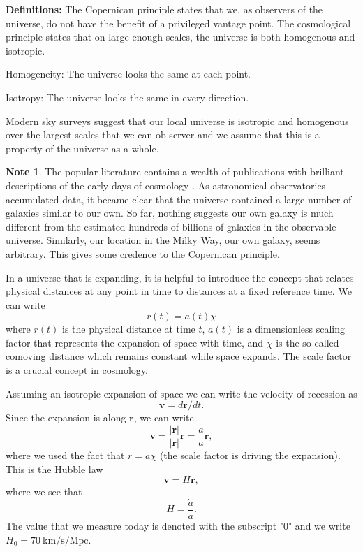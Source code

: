 \documentclass[a4paper,12pt]{article}
\theoremstyle{remark}
\newcommand{\mrm}[1]{\mathrm{#1}}
\renewcommand{\=}[1]{\stackrel{#1}{=}} %
\theoremstyle{plain}
\theoremstyle{definition}
\newtheorem*{definitionT}{Note}%
\newenvironment{note}{
\begin{dBox}
\begin{definitionT}}
{\end{definitionT}
\end{dBox}}
\begin{document}
\textbf{Definitions:} The Copernican principle states that we, as observers of the universe, do not have the benefit of a privileged vantage point. The cosmological principle states that on large enough scales, the universe is both homogenous and isotropic. 
 
Homogeneity: The universe looks the same at each point.

Isotropy: The universe looks the same in every direction.

Modern sky surveys suggest that our local universe is isotropic and homogenous over the largest scales that we can ob server and we assume that this is a property of the universe as a whole.

 \begin{note}
 The popular literature contains a wealth of publications with brilliant descriptions of the early days of cosmology \cite{Lemaitre2005, Guth1997, Singh2005, Weinberg1993}. As astronomical observatories accumulated data, it became clear that the universe contained a large number of galaxies similar to our own. So far, nothing suggests our own galaxy is much different from the estimated hundreds of billions of galaxies in the observable universe. Similarly, our location in the Milky Way, our own galaxy, seems arbitrary. This gives some credence to the Copernican principle.
 \end{note}

In a universe that is expanding, it is helpful to introduce the concept that relates physical distances at any point in time to distances at a fixed reference time. We can write
\begin{equation}
r(t) = a(t) \chi
\end{equation}
where $r(t)$ is the physical distance at time $t$, $a(t)$ is a dimensionless scaling factor that represents the expansion of space with time, and $\chi$ is the so-called comoving distance which remains constant while space expands. The scale factor is a crucial concept in cosmology. 

Assuming an isotropic expansion of space we can write the velocity of recession as 
\begin{equation}
\bm{v} = d\bm{r} / dt.
\end{equation}
Since the expansion is along $\bm{r}$, we can write 
\begin{equation}
\bm{v} = \frac{|\dot{\bm{r}}|}{|\bm{r}|} \bm{r} = \frac{\dot{a}}{a} \bm{r},
\end{equation}
where we used the fact that $r = a\chi$ (the scale factor is driving the expansion). This is the Hubble law
\begin{equation}
\bm{v} = H\bm{r},
\end{equation}
where we see that 
\begin{equation}
H = \frac{\dot{a}}{a}.
\end{equation}
The value that we measure today is denoted with the subscript "0" and we write $H_0 = 70 \:\mrm{km/s/Mpc}$.
\end{document}
